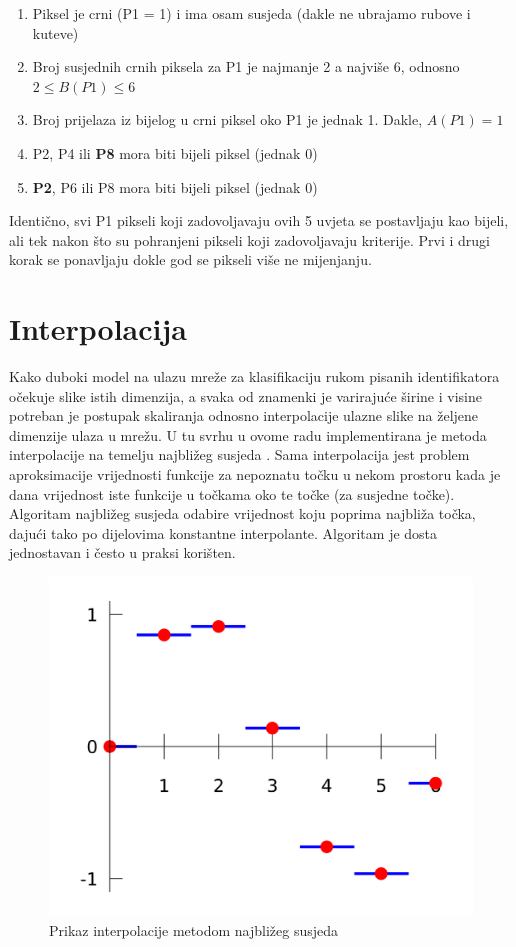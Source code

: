 \documentclass[times, utf8, diplomski]{fer}
\theoremstyle{definition}
\begin{document}
\begin{enumerate}
\item Piksel je crni (P1 = 1) i ima osam susjeda (dakle ne ubrajamo rubove i kuteve)
\item Broj susjednih crnih piksela za P1 je najmanje 2 a najviše 6, odnosno $2\leq B(P1)\leq6$
\item Broj prijelaza iz bijelog u crni piksel oko P1 je jednak 1. Dakle, $A(P1) = 1$
\item P2, P4 ili \textbf{P8} mora biti bijeli piksel (jednak 0)
\item \textbf{P2}, P6 ili P8 mora biti bijeli piksel (jednak 0)
\end{enumerate}

Identično, svi P1 pikseli koji zadovoljavaju ovih 5 uvjeta se postavljaju kao bijeli, ali tek nakon što su pohranjeni pikseli koji zadovoljavaju kriterije. Prvi i drugi korak se ponavljaju dokle god se pikseli više ne mijenjanju.


\section{Interpolacija}
Kako duboki model na ulazu mreže za klasifikaciju rukom pisanih identifikatora očekuje slike istih dimenzija, a svaka od znamenki je varirajuće širine i visine potreban je postupak skaliranja odnosno interpolacije ulazne slike na željene dimenzije ulaza u mrežu. U tu svrhu u ovome radu implementirana je metoda interpolacije na temelju najbližeg susjeda . Sama interpolacija jest problem aproksimacije vrijednosti funkcije za nepoznatu točku u nekom prostoru kada je dana vrijednost iste funkcije u točkama oko te točke (za susjedne točke). Algoritam najbližeg susjeda odabire vrijednost koju poprima najbliža točka, dajući tako po dijelovima konstantne interpolante. Algoritam je dosta jednostavan i često u praksi korišten.

\begin{figure}[h]
\centering
\includegraphics[scale=0.12]{n_n_interpolation.png}
\caption{Prikaz interpolacije metodom najbližeg susjeda}
\end{figure}
\end{document}
